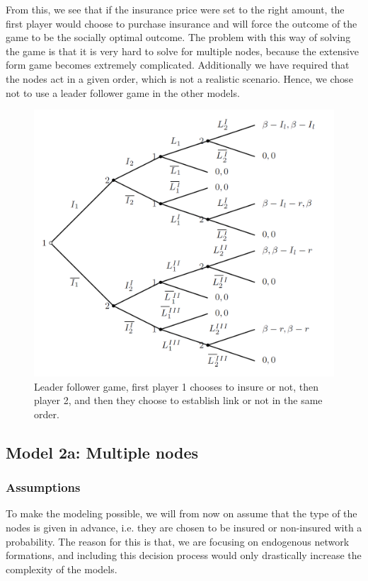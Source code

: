 From this, we see that if the insurance price were set to the right amount, the first player would choose to purchase insurance and will force the outcome of the game to be the socially optimal outcome. 
The problem with this way of solving the game is that it is very hard to solve for multiple nodes, because the extensive form game becomes extremely complicated. Additionally we have required that the nodes act in a given order, which is not a realistic scenario. Hence, we chose not to use a leader follower game in the other models.

 

\begin{figure}[h]
\centering
  \includegraphics[width=0.9\linewidth]{../Figures/stackelberggame.png}
  \caption{\label{fig:stackelberg} Leader follower game, first player 1 chooses to insure or not, then player 2, and then they choose to establish link or not in the same order.}
\end{figure}


\subsection{Model 2a: Multiple nodes}
\subsubsection{Assumptions}
To make the modeling possible, we will from now on assume that the type of the nodes is given in advance, i.e. they are chosen to be insured or non-insured with a probability. The reason for this is that, we are focusing on endogenous network formations, and including this decision process would only drastically increase the complexity of the models. 


